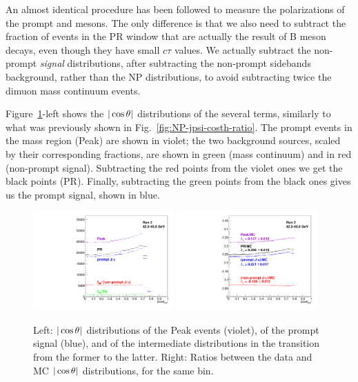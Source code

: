 \vfill\newpage

An almost identical procedure has been followed to measure the polarizations of the
prompt \jpsi and \psip mesons. The only difference is that we also need to subtract
the fraction of events in the PR window that are actually the result of B meson decays,
even though they have small $c\tau$ values.
We actually subtract the non-prompt \emph{signal} distributions, 
after subtracting the non-prompt sidebands background,
rather than the NP distributions, 
to avoid subtracting twice the dimuon mass continuum events.

Figure~\ref{fig:PR-jpsi-costh-ratio}-left shows the $|\cos\theta|$ distributions of
the several terms, 
similarly to what was previously shown in Fig.~\ref{fig:NP-jpsi-costh-ratio}.
The prompt events in the \jpsi mass region (Peak) are shown in violet;
the two background sources, scaled by their corresponding fractions,
are shown in green (mass continuum) and in red (non-prompt \jpsi signal).
Subtracting the red points from the violet ones we get the black points (PR).
Finally, subtracting the green points from the black ones gives us the 
prompt \jpsi signal, shown in blue.

\begin{figure}[h]
\centering
\includegraphics[width=0.48\textwidth]{Figures/chapter5/bin3B_7-jpsiPR.pdf}
\includegraphics[width=0.48\textwidth]{Figures/chapter5/bin3F_7-jpsiPR.pdf}
\caption{Left: $|\cos\theta|$ distributions of the Peak events (violet),
of the prompt \jpsi signal (blue), and of the intermediate distributions in the 
transition from the former to the latter.
Right: Ratios between the data and MC $|\cos\theta|$ distributions, 
for the same \pt bin.}
\label{fig:PR-jpsi-costh-ratio}
\end{figure}

